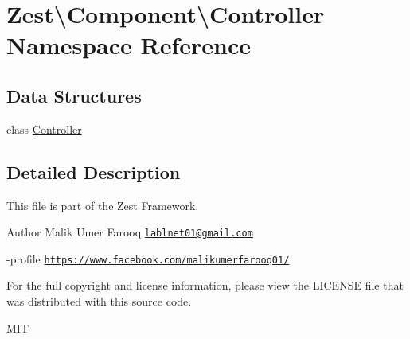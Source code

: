 \hypertarget{namespace_zest_1_1_component_1_1_controller}{}\section{Zest\textbackslash{}Component\textbackslash{}Controller Namespace Reference}
\label{namespace_zest_1_1_component_1_1_controller}
\subsection*{Data Structures}
\begin{DoxyCompactItemize}
\item 
class \mbox{\hyperlink{class_zest_1_1_component_1_1_controller_1_1_controller}{Controller}}
\end{DoxyCompactItemize}


\subsection{Detailed Description}
This file is part of the Zest Framework.

\begin{DoxyAuthor}{Author}
Malik Umer Farooq \href{mailto:lablnet01@gmail.com}{\tt lablnet01@gmail.\+com} 

-\/profile \href{https://www.facebook.com/malikumerfarooq01/}{\tt https\+://www.\+facebook.\+com/malikumerfarooq01/}
\end{DoxyAuthor}
For the full copyright and license information, please view the L\+I\+C\+E\+N\+SE file that was distributed with this source code.

M\+IT 